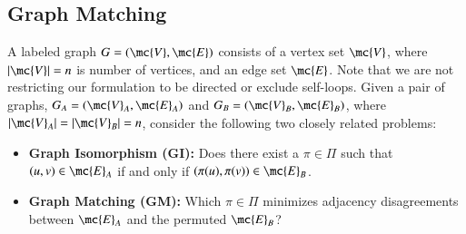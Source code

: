 \documentclass[preprint,11pt]{elsarticle}
\begin{document}
\subsection{Graph Matching} %
\label{sec:GM}




A labeled graph $G=(\mc{V},\mc{E})$ consists of a vertex set $\mc{V}$, where $|\mc{V}|=n$ is number of vertices, and an edge set $\mc{E}$. %
Note that we are not restricting our formulation to be directed or exclude self-loops. Given a pair of graphs, $G_A=(\mc{V}_A,\mc{E}_A)$ and $G_B=(\mc{V}_B,\mc{E}_B)$, where $|\mc{V}_A|=|\mc{V}_B|=n$, 
consider the following two closely related problems:
\begin{itemize}
	\item \textbf{Graph Isomorphism (GI):}  Does there exist a $\pi \in \Pi$ such that $(u,v) \in \mc{E}_A$ if and only if $(\pi(u),\pi(v)) \in \mc{E}_B$. 
		\item \textbf{Graph Matching (GM):}
		 Which $\pi \in \Pi$ minimizes adjacency disagreements between $\mc{E}_A$ and the permuted $\mc{E}_B$?
\end{itemize}
\end{document}
